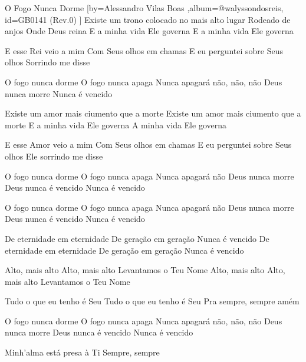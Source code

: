 \beginsong
{O Fogo Nunca Dorme %
}[by={Alessandro Vilas Boas %
},album={@walyssondosreis},
id={GB0141 %
(Rev.0) %
}]
Existe um trono colocado no mais alto lugar
Rodeado de anjos
Onde Deus reina
E a minha vida Ele governa
E a minha vida Ele governa

E esse Rei veio a mim
Com Seus olhos em chamas
E eu perguntei sobre Seus olhos
Sorrindo me disse

O fogo nunca dorme
O fogo nunca apaga
Nunca apagará não, não, não
Deus nunca morre
Nunca é vencido

Existe um amor mais ciumento que a morte
Existe um amor mais ciumento que a morte
E a minha vida Ele governa
A minha vida Ele governa

E esse Amor veio a mim
Com Seus olhos em chamas
E eu perguntei sobre Seus olhos
Ele sorrindo me disse

O fogo nunca dorme
O fogo nunca apaga
Nunca apagará não
Deus nunca morre
Deus nunca é vencido
Nunca é vencido

O fogo nunca dorme
O fogo nunca apaga
Nunca apagará não
Deus nunca morre
Deus nunca é vencido
Nunca é vencido

De eternidade em eternidade
De geração em geração
Nunca é vencido
De eternidade em eternidade
De geração em geração
Nunca é vencido

Alto, mais alto
Alto, mais alto
Levantamos o Teu Nome
Alto, mais alto
Alto, mais alto
Levantamos o Teu Nome

Tudo o que eu tenho é Seu
Tudo o que eu tenho é Seu
Pra sempre, sempre amém

O fogo nunca dorme
O fogo nunca apaga
Nunca apagará não, não, não
Deus nunca morre
Deus nunca é vencido
Nunca é vencido

Minh'alma está presa à Ti
Sempre, sempre


